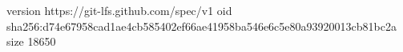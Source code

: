 version https://git-lfs.github.com/spec/v1
oid sha256:d74e67958cad1ae4cb585402ef66ae41958ba546e6c5e80a93920013cb81bc2a
size 18650
